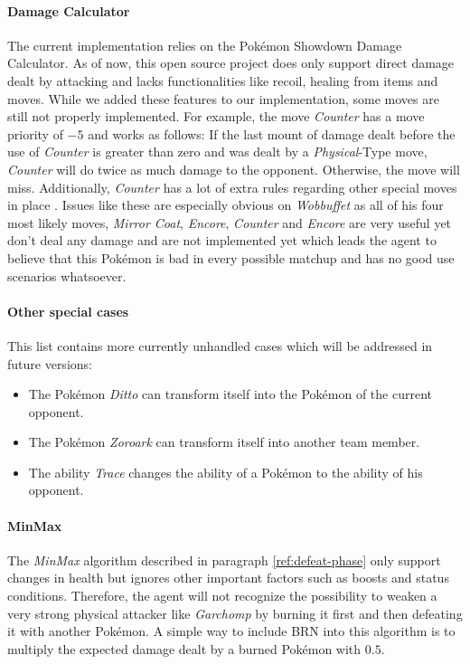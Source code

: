 \paragraph{Damage Calculator}
The current implementation relies on the Pokémon Showdown Damage Calculator. As of now, this open source project does 
only support direct damage dealt by attacking and lacks functionalities like recoil, healing from items and moves. While
we added these features to our implementation, some moves are still not properly implemented. For example, the move
\textit{Counter} has a move priority  of $-5$ and works as follows:
If the last mount of damage dealt before the use of \textit{Counter} is greater than zero and was dealt by a 
\textit{Physical}-Type move, \textit{Counter} will do twice as much damage to the opponent. Otherwise, the move
will miss. Additionally, \textit{Counter} has a lot of extra rules regarding other special moves in place 
\cite{Bulbapedia:Counter}. Issues like these are especially obvious on \textit{Wobbuffet} as all of his four
most likely moves, \textit{Mirror Coat}, \textit{Encore}, \textit{Counter} and \textit{Encore} are very useful
yet don't deal any damage and are not implemented yet which leads the agent to believe that this Pokémon is bad 
in every possible matchup and has no good use scenarios whatsoever.

\paragraph{Other special cases}
This list contains more currently unhandled cases which will be addressed in future versions:
\begin{itemize}
  \item The Pokémon \textit{Ditto} can transform itself into the Pokémon of the current opponent.
  \item The Pokémon \textit{Zoroark} can transform itself into another team member. 
  \item The ability \textit{Trace} changes the ability of a Pokémon to the ability of his opponent.
\end{itemize}

\paragraph{MinMax}
The \textit{MinMax} algorithm described in paragraph \ref{ref:defeat-phase} only support changes in health
but ignores other important factors such as boosts and status conditions. Therefore, the agent will 
not recognize the possibility to weaken a very strong physical attacker like \textit{Garchomp} by burning
it first and then defeating it with another Pokémon. A simple way to include \ac{BRN} into this algorithm
is to multiply the expected damage dealt by a burned Pokémon with $0.5$. 

